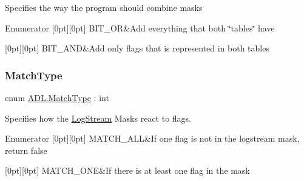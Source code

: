 Specifies the way the program should combine masks 

\begin{DoxyEnumFields}{Enumerator}
[0pt][0pt]{}\mbox{\label{namespace_a_d_l_a887d1db091d273083278875e32842128a377da01fa3eaa9e9d6a69a2fa415fe7b}} 
B\+I\+T\+\_\+\+OR&Add everything that both \char`\"{}tables\char`\"{} have \\
\hline

[0pt][0pt]{}\mbox{\label{namespace_a_d_l_a887d1db091d273083278875e32842128a4bece6f4e59c0e3f185e3003dfd37b1d}} 
B\+I\+T\+\_\+\+A\+ND&Add only flags that is represented in both tables \\
\hline

\end{DoxyEnumFields}
\mbox{\label{namespace_a_d_l_af6334296dbae0383a652317263f0bc05}} 
\subsubsection{\texorpdfstring{Match\+Type}{MatchType}}
{\footnotesize\ttfamily enum \mbox{\hyperlink{namespace_a_d_l_af6334296dbae0383a652317263f0bc05}{A\+D\+L.\+Match\+Type}} \+: int\hspace{0.3cm}{\ttfamily [strong]}}



Specifies how the \mbox{\hyperlink{class_a_d_l_1_1_log_stream}{Log\+Stream}} Masks react to flags. 

\begin{DoxyEnumFields}{Enumerator}
[0pt][0pt]{}\mbox{\label{namespace_a_d_l_af6334296dbae0383a652317263f0bc05a627c7991c5d0265194247e92fcf120b0}} 
M\+A\+T\+C\+H\+\_\+\+A\+LL&If one flag is not in the logstream mask, return false \\
\hline

[0pt][0pt]{}\mbox{\label{namespace_a_d_l_af6334296dbae0383a652317263f0bc05ae732aeff37126a99228f0e497f1beb04}} 
M\+A\+T\+C\+H\+\_\+\+O\+NE&If there is at least one flag in the mask \\
\hline

\end{DoxyEnumFields}
